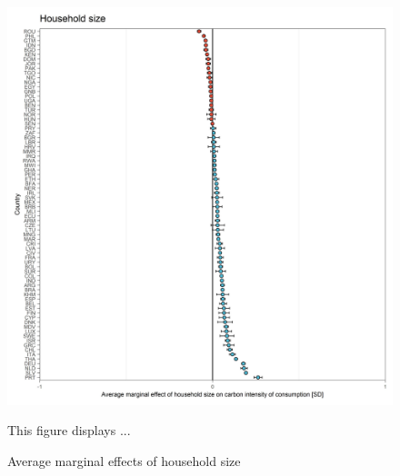 \documentclass[12pt, a4paper]{article}
\newenvironment{subcaption}
{\strut
\vspace{-5pt}
\begin{minipage}[b]{0.9\textwidth}
  \hspace*{-\parindent}
  \footnotesize}
 {\end{minipage}}
\begin{document}
\begin{figure}[ht!]
  \centering
 \caption{Average marginal effects of household size} \label{fig:E3_Size}
  \includegraphics{Analysis_OLS_ME_Carbon_Intensity/AME_OLS_CI_hh_size}
  \begin{subcaption}
    This figure displays ...
  \end{subcaption}

\end{figure}

\clearpage
\end{document}
